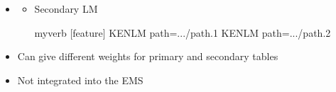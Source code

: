 \documentclass[landscape]{uedslides2C}
\newcommand{\currenttopic}[1]{\colorbox{lightyellow}{\textcolor{black}{\bf #1}}}
\begin{document}

\begin{itemize} \itemsep -1mm
  \item
  \begin{itemize}
  \item Secondary LM\\[4mm]
  \begin{SaveVerbatim}{myverb} 
    [feature]
    KENLM path=.../path.1
    KENLM path=.../path.2
  \end{SaveVerbatim}
  \colorbox{gray}{}

  \end{itemize}

  \item Can give different weights for primary and secondary tables
  \item Not integrated into the EMS
\end{itemize}

% 
% 
% 
% 
% 
% 
\end{document}
